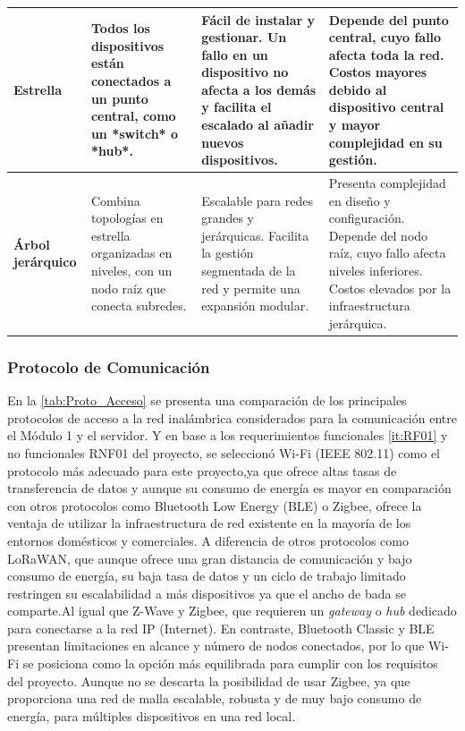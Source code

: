 \begin{longtable}{|>{\raggedright\arraybackslash}p{1.8cm}|>{\raggedright\arraybackslash}p{4.2cm}|>{\raggedright\arraybackslash}p{4.2cm}|>{\raggedright\arraybackslash}p{4.2cm}|}
\textbf{Estrella} & Todos los dispositivos están conectados a un punto central, como un *switch* o *hub*. & Fácil de instalar y gestionar. Un fallo en un dispositivo no afecta a los demás y facilita el escalado al añadir nuevos dispositivos. & Depende del punto central, cuyo fallo afecta toda la red. Costos mayores debido al dispositivo central y mayor complejidad en su gestión. \\ \hline

\textbf{Árbol jerárquico} & Combina topologías en estrella organizadas en niveles, con un nodo raíz que conecta subredes. & Escalable para redes grandes y jerárquicas. Facilita la gestión segmentada de la red y permite una expansión modular. & Presenta complejidad en diseño y configuración. Depende del nodo raíz, cuyo fallo afecta niveles inferiores. Costos elevados por la infraestructura jerárquica. \\ \hline

\end{longtable}
\endgroup


\subsubsection{Protocolo de Comunicación}

En la \cref{tab:Proto_Acceso} se presenta una comparación de los principales
protocolos de acceso a la red inalámbrica considerados para la comunicación entre el Módulo 1 y 
el servidor. Y en base a los requerimientos funcionales \ref{it:RF01} y 
no funcionales RNF01 del proyecto, se seleccionó Wi-Fi (IEEE 802.11) 
como el protocolo más adecuado para este proyecto,ya que ofrece altas tasas de 
transferencia de datos y aunque su consumo de energía es mayor en comparación 
con otros protocolos como Bluetooth Low Energy (BLE) o Zigbee, ofrece la ventaja
de utilizar la infraestructura de red existente en la mayoría de 
los entornos domésticos y comerciales.
\newline 
A diferencia de otros protocolos como LoRaWAN,
que aunque ofrece una gran distancia de comunicación y bajo consumo de energía,
su baja tasa de datos y un ciclo de trabajo limitado restringen su escalabilidad
a más dispositivos ya que el ancho de bada se comparte.Al igual que Z-Wave y Zigbee,
que requieren un \textit{gateway} o \textit{hub} dedicado para conectarse a la red IP (Internet).
En contraste, Bluetooth Classic y BLE presentan limitaciones en alcance y número de nodos conectados,
por lo que Wi-Fi se posiciona como la opción más equilibrada para cumplir con los requisitos del proyecto.
Aunque no se descarta la posibilidad de usar Zigbee, ya que proporciona una red de malla escalable, robusta y de muy bajo consumo de energía,
para múltiples dispositivos en una red local.

